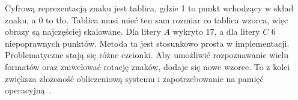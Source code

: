 \FloatBarrier
Cyfrową reprezentacją znaku jest tablica, gdzie 1 to punkt wchodzący w skład znaku, a 0 to tło.
Tablica musi mieć ten sam rozmiar co tablica wzorca, więc obrazy są najczęściej skalowane.
Dla litery $A$ wykryto 17, a dla litery $C$ 6 niepoprawnych punktów.
Metoda ta jest stosunkowo prosta w implementacji.
Problematyczne stają się różne czcionki.
Aby umożliwić rozpoznawanie wielu formatów oraz zniwelować rotację znaków, dodaje się nowe wzorce.
To z kolei zwiększa złożoność obliczeniową systemu i zapotrzebowanie na pamięć operacyjną~\cite{9310202}.